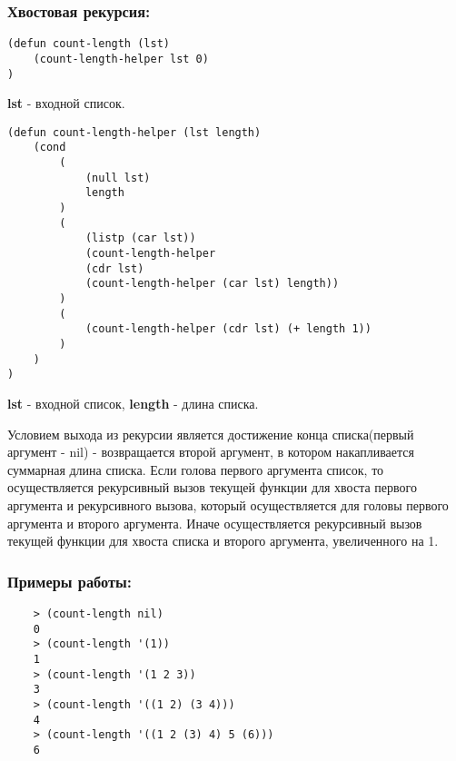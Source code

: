 \documentclass[a4paper, 12pt]{article}
\begin{document}
\subsubsection*{Хвостовая рекурсия:}
\begin{lstlisting}[caption=Функция-обертка для вычисления суммарной длины списков]
(defun count-length (lst)
	(count-length-helper lst 0)
)
\end{lstlisting}
\textbf{lst} - входной список.
\begin{lstlisting}[caption=Функция для вычисления суммарной длины списков]
(defun count-length-helper (lst length)
	(cond	
		(
			(null lst) 
			length
		)
		(
			(listp (car lst)) 
			(count-length-helper 
			(cdr lst) 
			(count-length-helper (car lst) length)) 
		)
		(
			(count-length-helper (cdr lst) (+ length 1))
		)
	)
)
\end{lstlisting}
\textbf{lst} - входной список, \textbf{length} - длина списка.

Условием выхода из рекурсии является достижение конца списка(первый аргумент - nil) - возвращается второй аргумент, в котором накапливается суммарная длина списка. Если голова первого аргумента список, то осуществляется рекурсивный вызов текущей функции для хвоста первого аргумента и рекурсивного вызова, который осуществляется для головы первого аргумента и второго аргумента. Иначе осуществляется рекурсивный вызов текущей функции для хвоста списка и второго аргумента, увеличенного на 1.

\subsubsection*{Примеры работы:}
\begin{lstlisting}
	> (count-length nil)
	0
	> (count-length '(1))
	1
	> (count-length '(1 2 3))
	3
	> (count-length '((1 2) (3 4)))
	4
	> (count-length '((1 2 (3) 4) 5 (6)))
	6
\end{lstlisting}
\end{document}

